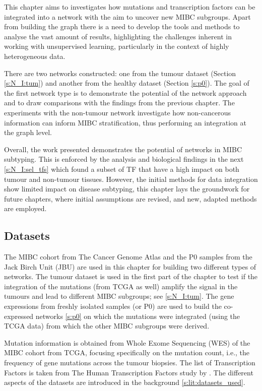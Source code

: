 This chapter aims to investigates how mutations and transcription factors can be integrated into a network with the aim to uncover new MIBC subgroups. Apart from building the graph there is a need to develop the tools and methods to analyse the vast amount of results, highlighting the challenges inherent in working with unsupervised learning, particularly in the context of highly heterogeneous data.

There are two networks constructed: one from the tumour dataset (Section \ref{s:N_I:tum}) and another from the healthy dataset (Section \ref{s:p0}). The goal of the first network type is to demonstrate the potential of the network approach and to draw comparisons with the findings from the previous chapter. The experiments with the non-tumour network investigate how non-cancerous information can inform MIBC stratification, thus performing an integration at the graph level.

Overall, the work presented demonstrates the potential of networks in MIBC subtyping. This is enforced by the analysis and biological findings in the next \cref{s:N_I:sel_tfs} which found a subset of TF that have a high impact on both tumour and non-tumour tissues. However, the initial methods for data integration show limited impact on disease subtyping, this chapter lays the groundwork for future chapters, where initial assumptions are revised, and new, adapted methods are employed.



\subsection*{Datasets}

The MIBC cohort from The Cancer Genome Atlas \citep{Tcga2018-sj} and the P0 samples from the Jack Birch Unit (JBU) are used in this chapter for building two different types of networks. The tumour dataset is used in the first part of the chapter to test if the integration of the mutations (from TCGA as well) amplify the signal in the tumours and lead to different MIBC subgroups; see \cref{s:N_I:tum}. The gene expressions from freshly isolated samples (or P0) are used to build the co-expressed networks \cref{s:p0} on which the mutations were integrated (using the TCGA data) from which the other MIBC subgroups were derived.

Mutation information is obtained from Whole Exome Sequencing (WES) of the MIBC cohort from TCGA, focusing specifically on the mutation count, i.e., the frequency of gene mutations across the tumour biopsies. The list of Transcription Factors is taken from The Human Transcription Factors study by \citet{Lambert2018-el}. The different aspects of the datasets are introduced in the background \cref{s:lit:datasets_used}.



